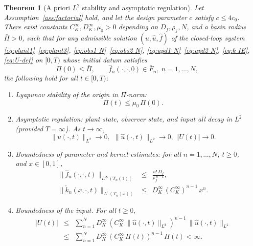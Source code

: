 \documentclass[journal,twoside,web]{ieeecolor}
\newtheorem{theorem}{Theorem}
\begin{document}
\begin{theorem}[A priori $L^2$ stability and asymptotic regulation]\label{thm:stability}
Let Assumption~\ref{ass:factorial} hold, and let the design parameter $c$ satisfy $c\le 4c_0$. There exist constants $C_K^\infty,D_K^\infty,\mu_0>0$ depending on $D_f,\rho_f,N$, and a basin radius $\bar\Pi>0$, such that for any admissible solution $(u,\hat u,\hat f)$ of the closed-loop system \eqref{eq:plant1}--\eqref{eq:plant3}, \eqref{eq:obs1-N}--\eqref{eq:obs2-N}, \eqref{eq:upd1-N}--\eqref{eq:upd2-N}, \eqref{eq:k-IE}, \eqref{eq:U-def} on $[0,T)$ whose initial datum satisfies
\begin{equation}\label{eq:thm-IC}
\Pi(0)\le\bar\Pi,\qquad \hat f_n(\cdot,\cdot,0)\in \bar F_n,\;n=1,\ldots,N,
\end{equation}
the following hold for all $t\in[0,T)$:
\begin{enumerate}
\item \emph{Lyapunov stability of the origin in $\Pi$-norm:}
\begin{equation}\label{eq:thm-stability}
\Pi(t)\le \mu_0\,\Pi(0).
\end{equation}
\item \emph{Asymptotic regulation: plant state, observer state, and input all decay in $L^2$ (provided $T=\infty$).} As $t\to\infty$,
\begin{equation}\label{eq:thm-regulation}
\|u(\cdot,t)\|_{L^2}\to 0,\ \ \|\hat u(\cdot,t)\|_{L^2}\to 0,\ \ |U(t)|\to 0.
\end{equation}
\item \emph{Boundedness of parameter and kernel estimates:} for all $n=1,\ldots,N$, $t\ge 0$, and $x\in[0,1]$,
\begin{eqnarray}
\|\hat f_n(\cdot,\cdot,t)\|_{L^\infty(T_n(1))} &\le& \frac{n!\,D_f}{\rho_f^{\,n-1}}, \label{eq:thm-fhat-bound}\\
\|\check k_n(x,\cdot,t)\|_{L^1(T_n(x))} &\le& D_K^\infty\,(C_K^\infty)^{n-1}\,x^n. \label{eq:thm-kcheck-bound}
\end{eqnarray}
\item \emph{Boundedness of the input.} For all $t\ge 0$,
\begin{eqnarray}
|U(t)| &\le& \sum_{n=1}^N D_K^\infty\,(C_K^\infty\,\|\hat u(\cdot,t)\|_{L^2})^{n-1}\,\|\hat u(\cdot,t)\|_{L^2} \nonumber\\
&\le& \sum_{n=1}^N D_K^\infty\,(C_K^\infty\,\Pi(t))^{n-1}\,\Pi(t)<\infty. \label{eq:thm-U-bound}
\end{eqnarray}
\end{enumerate}
\end{theorem}
\end{document}
